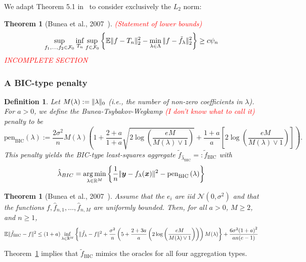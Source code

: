 \documentclass[12pt, letter paper]{article}
\newcommand{\1}{\mathmybb{1}}
\newtheorem{definition}{Definition}[section]
\newtheorem{theorem}[proposition]{Theorem}
\DeclareMathOperator*{\argmin}{arg\,min}
\newcommand{\R}{\mathbb{R}}
\newcommand{\0}{\emptyset}
\newcommand{\E}{\mathbb{E}}
\newcommand{\paren}[1]{\left(#1 \right)}
\newcommand{\sqbr}[1]{\left[#1 \right]}
\newcommand{\set}[1]{\left\{ #1 \right\}}
\newcommand{\norm}[1]{|\hspace{-1pt}|#1 |\hspace{-1pt}|}
\newcommand{\normsq}[1]{\norm{#1}^{2}}
\newcommand{\Ncal}{\mathcal{N}}
\newcommand{\x}{\boldsymbol{x}}
\newcommand{\y}{\boldsymbol{y}}
\newcommand{\fhat}[2]{\hat{f}_{#1, #2}}
\newcommand{\ftilde}[1]{\tilde{f}_{#1}}
\newcommand{\lambdahat}[1]{\hat{\lambda}_{#1}}
\newcommand{\penBIC}[1]{\mathrm{pen}_{\mathrm{BIC}}\paren{#1}}
\begin{document}
We adapt Theorem 5.1 in~\cite{bunea_2007} to consider exclusively the \(L_{2}\) norm:

\begin{theorem}[Bunea et al., 2007~\cite{bunea_2007}]\label{prop:buneath5.1}
    \textcolor{red}{(Statement of lower bounds)}
    \[\sup_{f_1, \ldots, f_2\in\mathcal{F}_{0}} \inf_{T_n}\sup_{f\in\mathcal{F}_0} \set{\E\normsq{f - T_n}_{2} - \min_{\lambda\in\Lambda}\normsq{f - \ftilde{\lambda}}_{2}} \geq c\psi_{n}\]
    \textcolor{red}{INCOMPLETE SECTION}
\end{theorem}

\subsubsection{A BIC-type penalty}
\begin{definition}
    Let \(M(\lambda) := \norm{\lambda}_{0}\) (i.e., the number of non-zero coefficients in \(\lambda\)). For \(a>0\), we define the Bunea-Tsybakov-Wegkamp \textcolor{red}{(I don't know what to call it)} penalty to be
    \[\penBIC{\lambda} := \frac{2\sigma^{2}}{n}M(\lambda)\paren{1+\frac{2+a}{1+a}\sqrt{2\log\paren{\frac{eM}{M(\lambda)\lor 1}}} + \frac{1+a}{a}\sqbr{2\log\paren{\frac{eM}{M(\lambda)\lor 1}}}}.\]
    This penalty yields the BIC-type least-squares aggregate \(\ftilde{\lambdahat{\mathrm{BIC}}}=:\ftilde{\mathrm{BIC}}\) with 
    \[\lambdahat{BIC}=\argmin_{\lambda\in\R^{M}}\set{\frac{1}{n}\normsq{\y - f_{\lambda}(\x)} - \penBIC{\lambda}}\]
\end{definition}

\begin{theorem}[Bunea et al., 2007~\cite{bunea_2007}]\label{prop:buneath3.1}
    Assume that the \(e_{i}\) are iid \(\Ncal(0, \sigma^{2})\) and that the functions \(f, \fhat{n}{1}, \ldots, \fhat{n}{M}\) are uniformly bounded. Then, for all \(a>0\), \(M\geq 2\), and \(n\geq 1\),
    \[\E\normsq{\ftilde{\mathrm{BIC}} - f}\leq (1+a)\inf_{\lambda\in\R^{M}}\set{\normsq{\ftilde{\lambda} - f} + \frac{\sigma^{2}}{n}\paren{5+\frac{2+3a}{a}\paren{2\log\paren{\frac{eM}{M(\lambda)\lor 1}}}}M(\lambda)} + \frac{6\sigma^{2}{(1+a)}^{2}}{an(e-1)}\]
\end{theorem}

Theorem~\ref{prop:buneath3.1} implies that \(\ftilde{\mathrm{BIC}}\) mimics the oracles for all four aggregation types.

\newpage
\printbibliography{}
\end{document}

